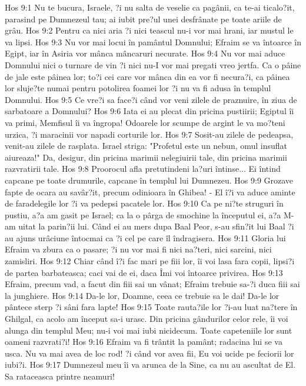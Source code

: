 Hos 9:1  Nu te bucura, Israele, ?i nu salta de veselie ca pagânii, ca te-ai ticalo?it, parasind pe Dumnezeul tau; ai iubit pre?ul unei desfrânate pe toate ariile de grâu.
Hos 9:2  Pentru ca nici aria ?i nici teascul nu-i vor mai hrani, iar mustul le va lipsi.
Hos 9:3  Nu vor mai locui în pamântul Domnului; Efraim se va întoarce în Egipt, iar în Asiria vor mânca mâncaruri necurate.
Hos 9:4  Nu vor mai aduce Domnului nici o turnare de vin ?i nici nu-I vor mai pregati vreo jertfa. Ca o pâine de jale este pâinea lor; to?i cei care vor mânca din ea vor fi necura?i, ca pâinea lor sluje?te numai pentru potolirea foamei lor ?i nu va fi adusa în templul Domnului.
Hos 9:5  Ce vre?i sa face?i când vor veni zilele de praznuire, în ziua de sarbatoare a Domnului?
Hos 9:6  Iata ei au plecat din pricina pustiirii; Egiptul îi va primi, Memfisul îi va îngropa! Odoarele lor scumpe de argint le va mo?teni urzica, ?i maracinii vor napadi corturile lor.
Hos 9:7  Sosit-au zilele de pedeapsa, venit-au zilele de rasplata. Israel striga: "Profetul este un nebun, omul insuflat aiureaza!" Da, desigur, din pricina marimii nelegiuirii tale, din pricina marimii razvratirii tale.
Hos 9:8  Proorocul afla pretutindeni la?uri întinse... Ei întind capcane pe toate drumurile, capcane în templul lui Dumnezeu.
Hos 9:9  Grozave fapte de ocara au savâr?it, precum odinioara în Ghibea! - El î?i va aduce aminte de faradelegile lor ?i va pedepsi pacatele lor.
Hos 9:10  Ca pe ni?te struguri în pustiu, a?a am gasit pe Israel; ca la o pârga de smochine la începutul ei, a?a M-am uitat la parin?ii lui. Când ei au mers dupa Baal Peor, s-au sfin?it lui Baal ?i au ajuns urâciune întocmai ca ?i cel pe care îl îndragisera.
Hos 9:11  Gloria lui Efraim va zbura ca o pasare; ?i nu vor mai fi nici na?teri, nici sarcini, nici zamisliri.
Hos 9:12  Chiar când î?i fac mari pe fiii lor, îi voi lasa fara copii, lipsi?i de partea barbateasca; caci vai de ei, daca Îmi voi întoarce privirea.
Hos 9:13  Efraim, precum vad, a facut din fiii sai un vânat; Efraim trebuie sa-?i duca fiii sai la junghiere.
Hos 9:14  Da-le lor, Doamne, ceea ce trebuie sa le dai! Da-le lor pântece sterp ?i sâni fara lapte!
Hos 9:15  Toate rauta?ile lor ?i-au luat na?tere în Ghilgal, ca acolo am început sa-i urasc. Din pricina gândurilor celor rele, îi voi alunga din templul Meu; nu-i voi mai iubi nicidecum. Toate capeteniile lor sunt oameni razvrati?i!
Hos 9:16  Efraim va fi trântit la pamânt; radacina lui se va usca. Nu va mai avea de loc rod! ?i când vor avea fii, Eu voi ucide pe feciorii lor iubi?i.
Hos 9:17  Dumnezeul meu îi va arunca de la Sine, ca nu au ascultat de El. Sa rataceasca printre neamuri!
